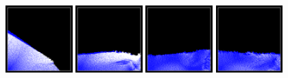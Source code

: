 \documentclass[12pt, A4]{article}
\begin{document}
\begin{figure}[h!]
  \centering
\includegraphics[width=0.23\textwidth]{semilag-state-b/img1}
\includegraphics[width=0.23\textwidth]{semilag-state-b/img2}
\includegraphics[width=0.23\textwidth]{semilag-state-b/img3}
\includegraphics[width=0.23\textwidth]{semilag-state-b/img4}


\end{figure}
\end{document}
